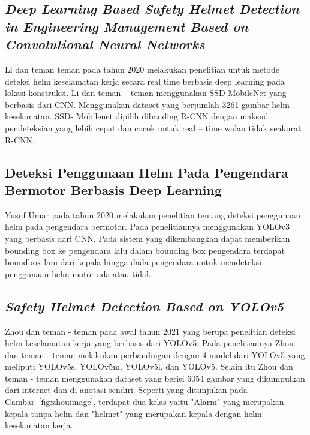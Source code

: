 \subsection{\emph{Deep Learning Based Safety Helmet Detection in Engineering Management Based on Convolutional Neural Networks}}
\label{subsec:deeplearningli2020}

Li dan teman teman pada tahun 2020 melakukan penelitian untuk metode deteksi helm keselamatan kerja secara real time berbasis deep learning pada lokasi konstruksi. Li dan teman – teman menggunakan SSD-MobileNet yang berbasis dari CNN. Menggunakan dataset yang berjumlah 3261 gambar helm keselamatan. SSD- Mobilenet dipilih dibanding R-CNN dengan maksud pendeteksian yang lebih cepat dan cocok untuk real – time walau tidak seakurat R-CNN. \cite{li2020deep}

\subsection{Deteksi Penggunaan Helm Pada Pengendara Bermotor Berbasis Deep Learning}
\label{subsec:deteksihelmmotoryusuf}
\par Yusuf Umar pada tahun 2020 melakukan penelitian tentang
 deteksi penggunaan helm pada pengendara bermotor. 
 Pada penelitiannya menggunakan YOLOv3 yang berbasis dari CNN. 
 Pada sistem yang dikembangkan dapat memberikan bounding box ke 
 pengendara lalu dalam bounding box pengendara terdapat boundbox 
 lain dari kepala hingga dada pengendara untuk mendeteksi 
 penggunaan helm motor ada atau tidak. \cite{hanafi2020deteksi}

\subsection{\emph{Safety Helmet Detection Based on YOLOv5}}
\label{subsec:safetyhelmetyolov5}
\par Zhou dan teman - teman pada awal tahun 2021 yang berupa penelitian deteksi helm keselamatan kerja yang 
berbasis dari YOLOv5. Pada penelitiannya Zhou dan teman - teman melakukan perbandingan dengan 4 model dari 
YOLOv5 yang meliputi YOLOv5s, YOLOv5m, YOLOv5l, dan YOLOv5. Selain itu Zhou dan teman - teman menggunakan 
dataset yang berisi 6054 gambar yang dikumpulkan dari internet dan di anotasi sendiri. 
Seperti yang ditunjukan pada Gambar~\ref{fig:zhouimage}, terdapat dua kelas yaitu "Alarm" yang merupakan kepala tanpa helm dan
"helmet"  yang merupakan kepala dengan helm keselamatan kerja\cite{zhou_zhao_nie_2021}.

